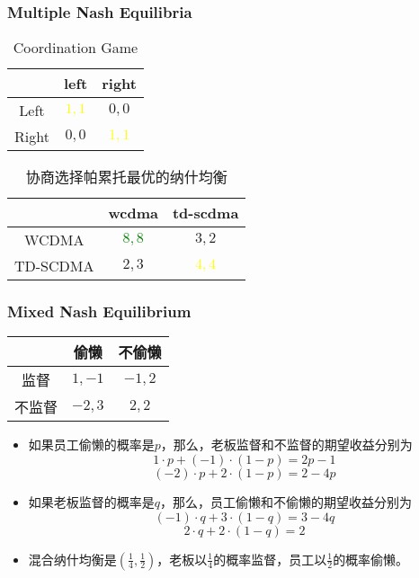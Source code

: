 \documentclass[UTF8,11pt,colorlinks,compress,openany]{beamer}%
\begin{document}
\begin{frame}\frametitle{Multiple Nash Equilibria}
\begin{table}
\abovetabulinesep=1mm
\belowtabulinesep=1mm
\begin{tabu}{c|cc}
\hline
 & left & right\\
\hline
Left & \textcolor{yellow}{$1,1$} & $0,0$\\
Right & $0,0$ & \textcolor{yellow}{$1,1$}\\
\hline
\end{tabu}\caption{Coordination Game}
\end{table}
\begin{table}
\abovetabulinesep=1mm
\belowtabulinesep=1mm
\begin{tabu}{c|cc}
\hline
 & wcdma & td-scdma\\
\hline
WCDMA & \textcolor{green}{$8,8$} & $3,2$\\
TD-SCDMA & $2,3$ & \textcolor{yellow}{$4,4$}\\
\hline
\end{tabu}\caption{协商选择帕累托最优的纳什均衡}
\end{table}
\end{frame}

\begin{frame}\frametitle{Mixed Nash Equilibrium}
\begin{table}
\abovetabulinesep=1mm
\belowtabulinesep=1mm
\begin{tabu}{c|c|c}
\hline
 & 偷懒 & 不偷懒 \\
\hline
监督 & $1,-1$ & $-1,2$ \\
不监督 & $-2,3$ & $2,2$ \\
\hline
\end{tabu}
\end{table}
\begin{itemize}
	\item 如果员工偷懒的概率是$p$，那么，老板监督和不监督的期望收益分别为
	\[1\cdot p+(-1)\cdot(1-p)=2p-1\]
	\[(-2)\cdot p+2\cdot(1-p)=2-4p\]
	\item 如果老板监督的概率是$q$，那么，员工偷懒和不偷懒的期望收益分别为
	\[(-1)\cdot q+3\cdot(1-q)=3-4q\]
	\[2\cdot q+2\cdot(1-q)=2\]
	\item 混合纳什均衡是$(\frac{1}{4},\frac{1}{2})$，老板以$\frac{1}{4}$的概率监督，员工以$\frac{1}{2}$的概率偷懒。
\end{itemize}
\end{frame}
\end{document}
